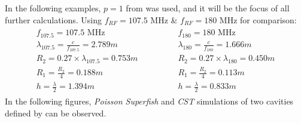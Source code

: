 \documentclass{article}
\begin{document}
In the following examples, $p=1$ from  was used, and it will be the focus of all further calculations.
Using $f_{RF}=107.5$ MHz \& $f_{RF}=180$ MHz for comparison:
\begin{eqnarray} \label{eq:107_180_MHZ_cavity_design_parameters}
    \begin{aligned}
        f_{107.5} = 107.5 \textrm{ MHz} \\
        \lambda_{107.5}  = \frac{c}{f_{107.5}} = 2.789 m \\
        R_2 = 0.27 \times \lambda_{107.5} = 0.753 m \\
        R_1 = \frac{R_2}{4} = 0.188 m \\
        h = \frac{\lambda}{2} = 1.394 m 
    \end{aligned}
    \qquad\qquad
    \begin{aligned}
        f_{180} = 180 \textrm{ MHz} \\
        \lambda_{180}  = \frac{c}{f_{180}} = 1.666 m \\
        R_2 = 0.27 \times\lambda_{180} = 0.450 m \\
        R_1 = \frac{R_2}{4} = 0.113 m \\
        h = \frac{\lambda}{2} = 0.833 m 
    \end{aligned}
\end{eqnarray}
In the following figures, \textit{Poisson Superfish} and \textit{CST} simulations of two cavities defined by  can be observed.
\end{document}
